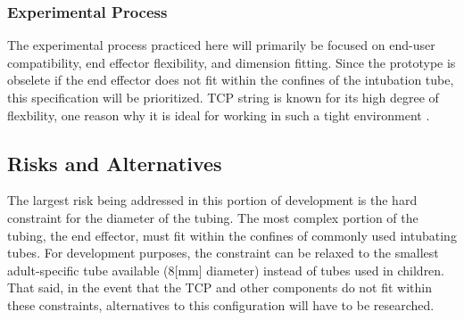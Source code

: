 	\subsubsection{Experimental Process}
	
		The experimental process practiced here will primarily be focused on end-user compatibility, end effector flexibility, and dimension fitting. Since the prototype is obselete if the end effector does not fit within the confines of the intubation tube, this specification will be prioritized. TCP string is known for its high degree of flexbility, one reason why it is ideal for working in such a tight environment \cite{haines_new_2016}.

\subsection{Risks and Alternatives}

	The largest risk being addressed in this portion of development is the hard constraint for the diameter of the tubing. The most complex portion of the tubing, the end effector, must fit within the confines of commonly used intubating tubes. For development purposes, the constraint can be relaxed to the smallest adult-specific tube available (8[mm] diameter) instead of tubes used in children. That said, in the event that the TCP and other components do not fit within these constraints, alternatives to this configuration will have to be researched.